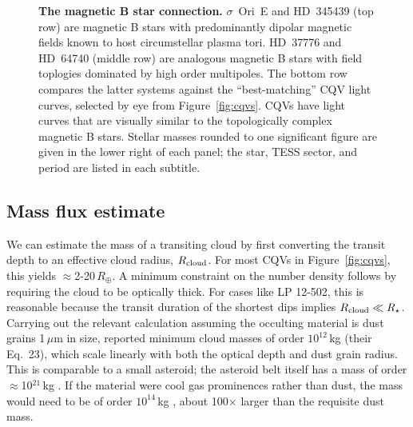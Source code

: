 \documentclass[11pt,twocolumn,tighten]{aastex63}
\begin{document}
\begin{figure}[!th]
	\begin{center}
		\centering
			
		\vspace{-0.35cm}

		\vspace{-0.35cm}

		\vspace{-0.1cm}
		\caption{
      {\bf The magnetic B star connection.}
      $\sigma$~Ori~E and HD~345439 (top row) are magnetic B stars with
      predominantly dipolar magnetic fields known to host
      circumstellar plasma tori.  HD~37776 and HD~64740 (middle row)
      are analogous magnetic B stars with field toplogies dominated by
      high order multipoles.  The bottom row compares the latter
      systems against the ``best-matching'' CQV light curves, selected
      by eye from Figure~\ref{fig:cqvs}.  CQVs have light curves that
      are visually similar to the topologically complex magnetic B
      stars.  Stellar masses rounded to one significant figure are
      given in the lower right of each panel; the star, TESS sector,
      and period are listed in each subtitle.
		}
		\label{fig:bstar}
	\end{center}
\end{figure}


\subsection{Mass flux estimate}
\label{subsec:massflux}

We can estimate the mass of a transiting cloud by first converting the
transit depth to an effective cloud radius, $R_{\rm cloud}$.  For most
CQVs in Figure~\ref{fig:cqvs}, this yields $\approx$2-20\,$R_\oplus$.
A minimum constraint on the number density follows by requiring the
cloud to be optically thick.  For cases like LP 12-502, this is
reasonable because the transit duration of the shortest dips implies
$R_{\rm cloud}\ll R_\star$.  Carrying out the relevant calculation
assuming the occulting material is dust grains 1\,$\mu$m in size,
\citet{2023MNRAS.518.4734S} reported minimum cloud masses of order
$10^{12}$\,kg (their Eq.~23), which scale linearly with both the
optical depth and dust grain radius.  This is comparable to a small
asteroid; the asteroid belt itself has a mass of order
$\approx$10$^{21}$\,kg \citep{2019Icar..319..812P}.  If the material
were cool gas prominences rather than dust, the mass would need to be
of order $10^{14}$\,kg \citep{1990MNRAS.247..415C}, about 100$\times$
larger than the requisite dust mass.
\end{document}
